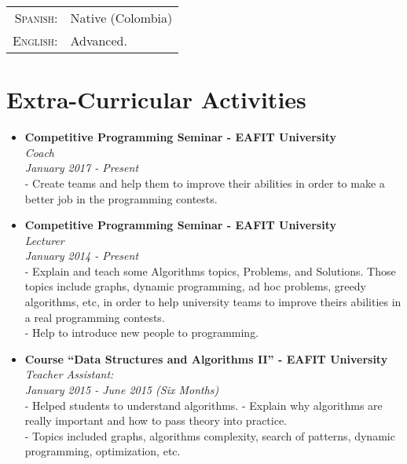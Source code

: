 \documentclass[a4paper,11pt]{article} %
\begin{document}
\begin{tabular}{rl}
\textsc{Spanish:} & Native (Colombia)\\
\textsc{English:} & Advanced.\\
\end{tabular}


\section{Extra-Curricular Activities}
\begin{itemize}
\item \textbf{Competitive Programming Seminar - EAFIT University}\\
\textit{Coach}\\
\textit{January 2017 - Present}\\
- Create teams and help them to improve their abilities in order to make a better job in the programming contests.\\
\item \textbf{Competitive Programming Seminar - EAFIT University}\\
\textit{Lecturer}\\
\textit{January 2014 - Present}\\
- Explain and teach some Algorithms topics, Problems, and Solutions. Those topics include graphs, dynamic programming, ad hoc problems, greedy algorithms, etc, in order to help university teams to improve theirs abilities in a real programming contests.\\
- Help to introduce new people to programming.
\item \textbf{Course ``Data Structures and Algorithms II'' - EAFIT University}\\
\textit{Teacher Assistant:}\\
\textit{January 2015 - June 2015 (Six Months)}\\
- Helped students to understand algorithms.
- Explain why algorithms are really important and how to pass theory into practice.\\
- Topics included graphs, algorithms complexity, search of patterns, dynamic programming, optimization, etc.\\
\end{itemize}
\end{document}
